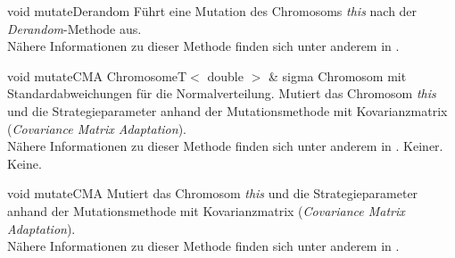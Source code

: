 \documentclass{report}
\begin{document}
\vspace{4ex}

\setNormalInstance
\setCorrectWidthThree{8pt}
\printMethodWithParamsSaved
{void}
{}
{mutateDerandom}
{F\"uhrt eine Mutation des Chromosoms {\em this} nach der 
 {\em Derandom}-Methode aus.\\
 N\"ahere Informationen zu dieser Methode finden sich unter anderem
 in \cite{GSA}.}
{}
\setCorrectWidthThree{4pt}

\vspace{4ex}

\setNormalInstance
\printMethodWithOneParam
{void}
{mutateCMA}
{ChromosomeT$<$ double $>$ \&}
{sigma}
{Chromosom mit Standardabweichungen f\"ur die Normalverteilung.}
{Mutiert das Chromosom {\em this} und die Strategieparameter anhand der 
 Mutationsmethode mit Kovarianzmatrix ({\em Covariance Matrix Adaptation}).\\
 N\"ahere Informationen zu dieser Methode finden sich unter anderem
 in \cite{CMA}.}
{Keiner.}
{Keine.}

\newpage

\setNormalInstance
\setCorrectWidthThree{8pt}
\printMethodWithParamsSaved
{void}
{}
{mutateCMA}
{Mutiert das Chromosom {\em this} und die Strategieparameter anhand der 
 Mutationsmethode mit Kovarianzmatrix ({\em Covariance Matrix Adaptation}).\\
 N\"ahere Informationen zu dieser Methode finden sich unter anderem
 in \cite{CMA}.}
{}
\setCorrectWidthThree{4pt}
\end{document}
